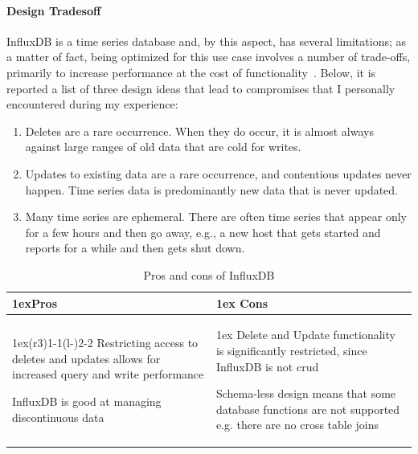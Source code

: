 \paragraph{Design Tradesoff}
InfluxDB is a time series database and, by this aspect, has several limitations; as a matter of fact,
being optimized for this use case involves a number of trade-offs, primarily to increase performance at the cost of functionality~\cite{Misc:influx_docs}.
Below, it is reported a list of three design ideas that lead to compromises that I personally encountered during my experience:
\begin{enumerate}
    \item Deletes are a rare occurrence. When they do occur, it is almost always against large ranges of old data that are cold for writes.
    \item Updates to existing data are a rare occurrence, and contentious updates never happen. Time series data is predominantly new data that is never updated.
    \item Many time series are ephemeral. There are often time series that appear only for a few hours and then go away, e.g., a new host that gets started and reports for a while and then gets shut down.
\end{enumerate}
\begin{table}[ht]
    \begin{tabularx}{\textwidth}{>{\parskip1ex}X@{\kern4\tabcolsep}>{\parskip1ex}X}
        \toprule
        \hfil\bfseries Pros
         &
        \hfil\bfseries Cons
        \\\cmidrule(r{3\tabcolsep}){1-1}\cmidrule(l{-\tabcolsep}){2-2}
        Restricting access to deletes and updates allows for increased query and write performance\par
        InfluxDB is good at managing discontinuous data\par
         &
        Delete and Update functionality is significantly restricted, since InfluxDB is not \acs{crud} \par
        Schema-less design means that some database functions are not supported e.g. there are no cross table joins\par
        \\\bottomrule
    \end{tabularx}
    \caption{Pros and cons of InfluxDB}
\end{table}
